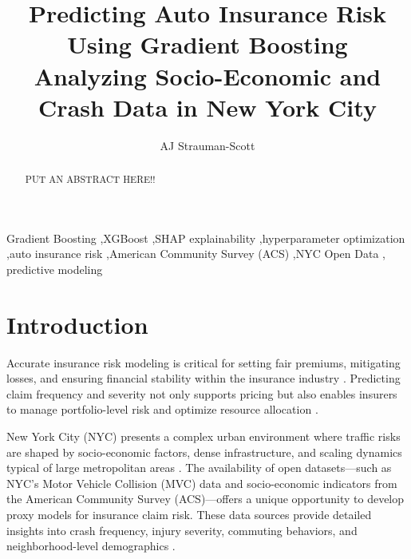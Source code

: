 \documentclass[
  number,
  review,
  3p]{elsarticle}
\begin{document}
\begin{frontmatter}
\title{Predicting Auto Insurance Risk Using Gradient
Boosting \\\large{Analyzing Socio-Economic and Crash Data in New York
City} }
\author[1]{AJ Strauman-Scott%
%
}



        
\begin{abstract}
PUT AN ABSTRACT HERE!!
\end{abstract}





\begin{keyword}
    Gradient Boosting \sep XGBoost \sep SHAP
explainability \sep hyperparameter optimization \sep auto insurance
risk \sep American Community Survey (ACS) \sep NYC Open Data \sep 
    predictive modeling
\end{keyword}
\end{frontmatter}
    

\section{Introduction}\label{introduction}

Accurate insurance risk modeling is critical for setting fair premiums,
mitigating losses, and ensuring financial stability within the insurance
industry \citep{henckaerts, clemente}. Predicting claim frequency and
severity not only supports pricing but also enables insurers to manage
portfolio-level risk and optimize resource allocation \citep{mohamed}.

New York City (NYC) presents a complex urban environment where traffic
risks are shaped by socio-economic factors, dense infrastructure, and
scaling dynamics typical of large metropolitan areas
\citep{cabrera, bettencourt}. The availability of open datasets---such
as NYC's Motor Vehicle Collision (MVC) data and socio-economic
indicators from the American Community Survey (ACS)---offers a unique
opportunity to develop proxy models for insurance claim risk. These data
sources provide detailed insights into crash frequency, injury severity,
commuting behaviors, and neighborhood-level demographics
\citep{adeniyi, brubacher}.
\end{document}
